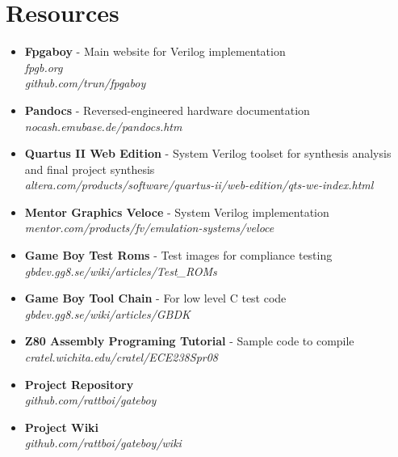 \section{Resources}
\begin{itemize}
    \item {\bf Fpgaboy}
            - Main website for Verilog implementation\\
            {\it fpgb.org} \\
            {\it github.com/trun/fpgaboy}
    \item {\bf Pandocs} - Reversed-engineered hardware documentation\\ 
            {\it nocash.emubase.de/pandocs.htm}
    \item {\bf Quartus II Web Edition} - System Verilog toolset 
             for synthesis analysis and final project synthesis\\
            {\it altera.com/products/software/quartus-ii/web-edition/qts-we-index.html}
    \item {\bf Mentor Graphics Veloce} - System Verilog implementation\\
            {\it mentor.com/products/fv/emulation-systems/veloce}
    \item {\bf Game Boy Test Roms}     - Test images for compliance testing\\
            {\it gbdev.gg8.se/wiki/articles/Test\_ROMs}
    \item {\bf Game Boy Tool Chain} - For low level C test code \\
            {\it gbdev.gg8.se/wiki/articles/GBDK}
    \item {\bf Z80 Assembly Programing Tutorial} - Sample code to compile\\
            {\it cratel.wichita.edu/cratel/ECE238Spr08}
    \item {\bf Project Repository}\\
            {\it github.com/rattboi/gateboy}
    \item {\bf Project Wiki}\\
            {\it github.com/rattboi/gateboy/wiki}
\end{itemize}

